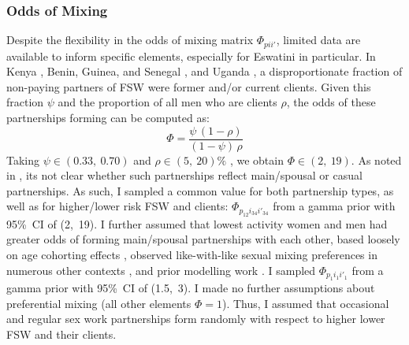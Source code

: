 \subsubsection{Odds of Mixing}\label{model.par.mix.odds}
Despite the flexibility in the odds of mixing matrix $\Phi_{pii'}$,
limited data are available to inform specific elements,
especially for Eswatini in particular.
In Kenya \cite{Voeten2007}, Benin, Guinea, and Senegal \cite{Godin2008}, and Uganda \cite{Mbonye2022},
a disproportionate fraction of non-paying partners of FSW were former and/or current clients.
Given this fraction $\psi$ and the proportion of all men who are clients $\rho$,
the odds of these partnerships forming can be computed as:
\begin{equation}
  \Phi = \frac{\psi\,(1-\rho)}{(1-\psi)\,\rho}
\end{equation}
Taking $\psi \in (0.33,~0.70)$ \cite{Voeten2007,Godin2008}
and $\rho \in (5,~20)\%$ \cite{Hodgins2022}, we obtain $\Phi \in (2,~19)$.
As noted in , its not clear whether such partnerships reflect
main/spousal or casual partnerships.
As such, I sampled a common value for both partnership types,
as well as for higher/lower risk FSW and clients:
$\Phi_{p_{12}i_{34}i'_{34}}$ from a gamma prior with 95\%~CI of (2,~19).
I further assumed that lowest activity women and men had
greater odds of forming main/spousal partnerships with each other,
based loosely on age cohorting effects \cite{Leclerc-Madlala2008},
observed like-with-like sexual mixing preferences in numerous other contexts
\cite{Morris1991,Garnett1993a,Admiraal2016},
and prior modelling work \cite{Knight2022sr}.
I sampled $\Phi_{p_{1}i_{1}i'_{1}}$ from a gamma prior with 95\%~CI of (1.5,~3).
I made no further assumptions about preferential mixing (\ie all other elements $\Phi = 1$).
Thus, I assumed that occasional and regular sex work partnerships form
randomly with respect to higher \vs lower FSW and their clients.
